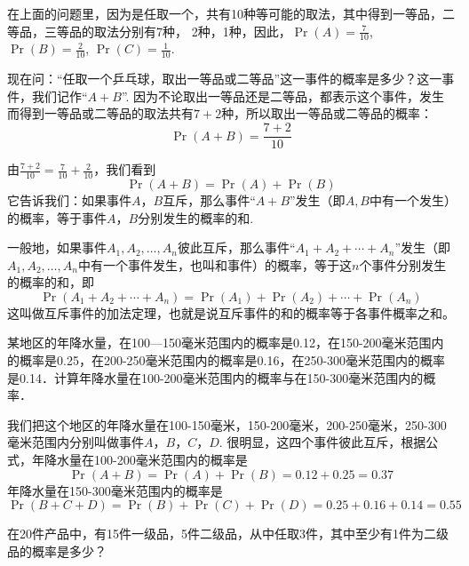 在上面的问题里，因为是任取一个，共有10种等可能的取法，其中得到一等品，二等品，三等品的取法分别有7种，
2种，1种，因此，$\Pr(A)=\frac{7}{10}$, $\Pr(B)=\frac{2}{10}$, $\Pr(C)=\frac{1}{10}$.

现在问：“任取一个乒乓球，取出一等品或二等品”这一事件的概率是多少？这一事件，我们记作“$A+B$”. 因为不论取出一等品还是二等品，都表示这个事件，发生而得到一等品或二等品的取法共有$7+2$种，所以取出一等品或二等品的概率：
\[\Pr(A+B)=\frac{7+2}{10}\]

由$\frac{7+2}{10}=\frac{7}{10}+\frac{2}{10}$，我们看到
\[\Pr(A+B)=\Pr(A)+\Pr(B)\]
它告诉我们：如果事件$A$，$B$互斥，那么事件“$A+B$”发生（即$A,B$中有一个发生）的概率，等于事件$A$，$B$分别发生的概率的和.

一般地，如果事件$A_1,A_2,\ldots,A_n$彼此互斥，那么事件“$A_1+A_2+\cdots+A_n$”发生（即$A_1,A_2,\ldots,A_n$中有一个事件发生，也叫和事件）的概率，等于这$n$个事件分别发生的概率的和，即
\[\Pr(A_1+A_2+\cdots+A_n)=\Pr(A_1)+\Pr(A_2)+\cdots+\Pr(A_n)\]
这叫做互斥事件的加法定理，也就是说互斥事件的和的概率等于各事件概率之和。

\begin{example}
    某地区的年降水量，在100—150毫米范围内的概率是0.12，在150-200毫米范围内的概率是0.25，在200-250毫米范围内的概率是0.16，在250-300毫米范围内的概率是0.14．计算年降水量在100-200毫米范围内的概率与在150-300毫米范围内的概率．
\end{example}

\begin{solution}
    我们把这个地区的年降水量在100-150毫米，150-200毫米，200-250毫米，250-300毫米范围内分别叫做事件$A$，$B$，$C$，$D$. 很明显，这四个事件彼此互斥，根据公式，年降水量在100-200毫米范围内的概率是
\[\Pr(A+B)=\Pr(A)+\Pr(B)=0.12+0.25=0.37\]
年降水量在150-300毫米范围内的概率是
\[\Pr(B+C+D)=\Pr(B)+\Pr(C)+\Pr(D)=0.25+0.16+0.14=0.55\]
\end{solution}


\begin{example}
    在20件产品中，有15件一级品，5件二级品，从中任取3件，其中至少有1件为二级品的概率是多少？
\end{example}


